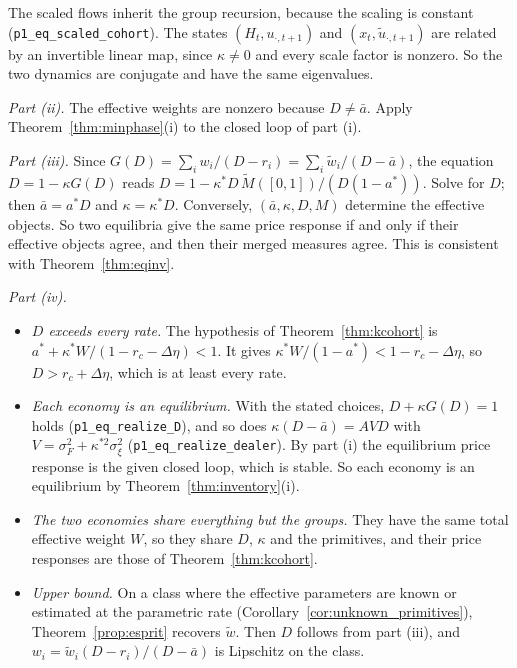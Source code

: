 \documentclass[12pt]{article}
\theoremstyle{definition}
\theoremstyle{remark}
\begin{document}
The scaled flows inherit the group recursion, because the scaling is constant (\nolinkurl{p1_eq_scaled_cohort}). The states $(H_t,u_{\cdot,t+1})$ and $(x_t,\tilde u_{\cdot,t+1})$ are related by an invertible linear map, since $\kappa\ne0$ and every scale factor is nonzero. So the two dynamics are conjugate and have the same eigenvalues.

\emph{Part (ii).} The effective weights are nonzero because $D\ne\bar a$. Apply Theorem~\ref{thm:minphase}(i) to the closed loop of part (i).

\emph{Part (iii).} Since $G(D)=\sum_iw_i/(D-r_i)=\sum_i\tilde w_i/(D-\bar a)$, the equation $D=1-\kappa G(D)$ reads $D=1-\kappa^*D\,\tilde M([0,1])/(D(1-a^*))$. Solve for $D$; then $\bar a=a^*D$ and $\kappa=\kappa^*D$. Conversely, $(\bar a,\kappa,D,M)$ determine the effective objects. So two equilibria give the same price response if and only if their effective objects agree, and then their merged measures agree. This is consistent with Theorem~\ref{thm:eqinv}.

\emph{Part (iv).}
\begin{itemize}[itemsep=1pt,topsep=2pt]
\item \emph{$D$ exceeds every rate.} The hypothesis of Theorem~\ref{thm:kcohort} is $a^*+\kappa^*W/(1-r_c-\Delta\eta)<1$. It gives $\kappa^*W/(1-a^*)<1-r_c-\Delta\eta$, so $D>r_c+\Delta\eta$, which is at least every rate.
\item \emph{Each economy is an equilibrium.} With the stated choices, $D+\kappa G(D)=1$ holds (\nolinkurl{p1_eq_realize_D}), and so does $\kappa(D-\bar a)=AVD$ with $V=\sigma_F^2+\kappa^{*2}\sigma_\xi^2$ (\nolinkurl{p1_eq_realize_dealer}). By part (i) the equilibrium price response is the given closed loop, which is stable. So each economy is an equilibrium by Theorem~\ref{thm:inventory}(i).
\item \emph{The two economies share everything but the groups.} They have the same total effective weight $W$, so they share $D$, $\kappa$ and the primitives, and their price responses are those of Theorem~\ref{thm:kcohort}.
\item \emph{Upper bound.} On a class where the effective parameters are known or estimated at the parametric rate (Corollary~\ref{cor:unknown_primitives}), Theorem~\ref{prop:esprit} recovers $\tilde w$. Then $D$ follows from part (iii), and $w_i=\tilde w_i(D-r_i)/(D-\bar a)$ is Lipschitz on the class.
\end{itemize}
\end{document}
